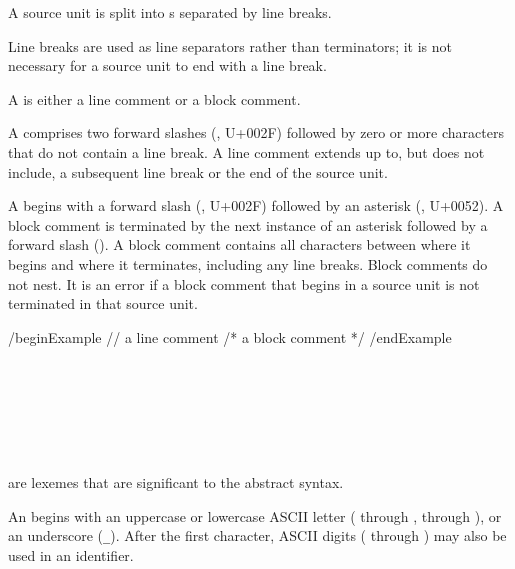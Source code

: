 A source unit is split into s separated by line breaks.

\begin{Note}
Line breaks are used as line separators rather than terminators; it is not necessary for a source unit to end with a line break.
\end{Note}


A  is either a line comment or a block comment.

A  comprises two forward slashes (\Char{/}, U+002F) followed by zero or more characters that do not contain a line break.
A line comment extends up to, but does not include, a subsequent line break or the end of the source unit.

A  begins with a forward slash (\Char{/}, U+002F) followed by an asterisk (\Char{*}, U+0052). 
A block comment is terminated by the next instance of an asterisk followed by a forward slash (\Char{*/}).
A block comment contains all characters between where it begins and where it terminates, including any line breaks.
Block comments do not nest.
It is an error if a block comment that begins in a source unit is not terminated in that source unit.

/begin{Example}
 // a line comment
 /* a block comment */
/end{Example}


\begin{Lexical}
     \\
         \\
    \SynOr {} \\
    \SynOr {} \\
    \SynOr {} \\
\end{Lexical}

 are lexemes that are significant to the abstract syntax.


An  begins with an uppercase or lowercase ASCII letter ( through ,  through ), or an underscore (\lstinline{_}).
After the first character, ASCII digits ( through ) may also be used in an identifier.


